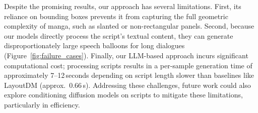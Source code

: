 Despite the promising results, our approach has several limitations. First, its reliance on bounding boxes prevents it from capturing the full geometric complexity of manga, such as slanted or non-rectangular panels. Second, because our models directly process the script's textual content, they can generate disproportionately large speech balloons for long dialogues (Figure~\ref{fig:failure_cases}). Finally, our LLM-based approach incurs significant computational cost; processing scripts results in a per-sample generation time of approximately 7--12\,seconds depending on script length slower than baselines like LayoutDM (approx.\ 0.66\,s). Addressing these challenges, future work could also explore conditioning diffusion models on scripts to mitigate these limitations, particularly in efficiency.